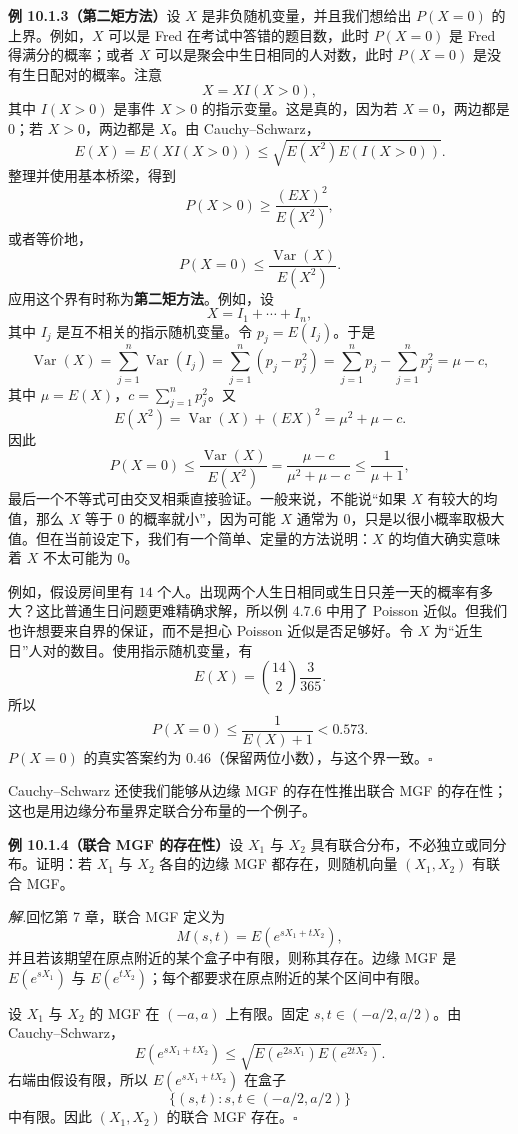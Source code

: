 \documentclass[UTF8,12pt,a4paper,fontset=fandol]{ctexart}
\begin{document}
\noindent\textbf{例 10.1.3（第二矩方法）}\quad 设 $X$ 是非负随机变量，并且我们想给出 $P(X=0)$ 的上界。例如，$X$ 可以是 Fred 在考试中答错的题目数，此时 $P(X=0)$ 是 Fred 得满分的概率；或者 $X$ 可以是聚会中生日相同的人对数，此时 $P(X=0)$ 是没有生日配对的概率。注意
\[
  X=XI(X>0),
\]
其中 $I(X>0)$ 是事件 $X>0$ 的指示变量。这是真的，因为若 $X=0$，两边都是 $0$；若 $X>0$，两边都是 $X$。由 Cauchy--Schwarz，
\[
  E(X)=E(XI(X>0))\le \sqrt{E(X^2)E(I(X>0))}.
\]
整理并使用基本桥梁，得到
\[
  P(X>0)\ge \frac{(EX)^2}{E(X^2)},
\]
或者等价地，
\[
  P(X=0)\le \frac{\operatorname{Var}(X)}{E(X^2)}.
\]
应用这个界有时称为\textbf{第二矩方法}。例如，设
\[
  X=I_1+\cdots+I_n,
\]
其中 $I_j$ 是互不相关的指示随机变量。令 $p_j=E(I_j)$。于是
\[
  \operatorname{Var}(X)=\sum_{j=1}^n\operatorname{Var}(I_j)
  =\sum_{j=1}^n(p_j-p_j^2)
  =\sum_{j=1}^n p_j-\sum_{j=1}^n p_j^2
  =\mu-c,
\]
其中 $\mu=E(X)$，$c=\sum_{j=1}^n p_j^2$。又
\[
  E(X^2)=\operatorname{Var}(X)+(EX)^2=\mu^2+\mu-c.
\]
因此
\[
  P(X=0)\le \frac{\operatorname{Var}(X)}{E(X^2)}
  =\frac{\mu-c}{\mu^2+\mu-c}\le \frac{1}{\mu+1},
\]
最后一个不等式可由交叉相乘直接验证。一般来说，不能说“如果 $X$ 有较大的均值，那么 $X$ 等于 $0$ 的概率就小”，因为可能 $X$ 通常为 $0$，只是以很小概率取极大值。但在当前设定下，我们有一个简单、定量的方法说明：$X$ 的均值大确实意味着 $X$ 不太可能为 $0$。

例如，假设房间里有 $14$ 个人。出现两个人生日相同或生日只差一天的概率有多大？这比普通生日问题更难精确求解，所以例 4.7.6 中用了 Poisson 近似。但我们也许想要来自界的保证，而不是担心 Poisson 近似是否足够好。令 $X$ 为“近生日”人对的数目。使用指示随机变量，有
\[
  E(X)=\binom{14}{2}\frac{3}{365}.
\]
所以
\[
  P(X=0)\le \frac{1}{E(X)+1}<0.573.
\]
$P(X=0)$ 的真实答案约为 $0.46$（保留两位小数），与这个界一致。$\square$

Cauchy--Schwarz 还使我们能够从边缘 MGF 的存在性推出联合 MGF 的存在性；这也是用边缘分布量界定联合分布量的一个例子。

\noindent\textbf{例 10.1.4（联合 MGF 的存在性）}\quad 设 $X_1$ 与 $X_2$ 具有联合分布，不必独立或同分布。证明：若 $X_1$ 与 $X_2$ 各自的边缘 MGF 都存在，则随机向量 $(X_1,X_2)$ 有联合 MGF。

\noindent\textit{解.}\quad 回忆第 7 章，联合 MGF 定义为
\[
  M(s,t)=E(e^{sX_1+tX_2}),
\]
并且若该期望在原点附近的某个盒子中有限，则称其存在。边缘 MGF 是 $E(e^{sX_1})$ 与 $E(e^{tX_2})$；每个都要求在原点附近的某个区间中有限。

设 $X_1$ 与 $X_2$ 的 MGF 在 $(-a,a)$ 上有限。固定 $s,t\in(-a/2,a/2)$。由 Cauchy--Schwarz，
\[
  E(e^{sX_1+tX_2})\le \sqrt{E(e^{2sX_1})E(e^{2tX_2})}.
\]
右端由假设有限，所以 $E(e^{sX_1+tX_2})$ 在盒子
\[
  \{(s,t):s,t\in(-a/2,a/2)\}
\]
中有限。因此 $(X_1,X_2)$ 的联合 MGF 存在。$\square$
\end{document}
